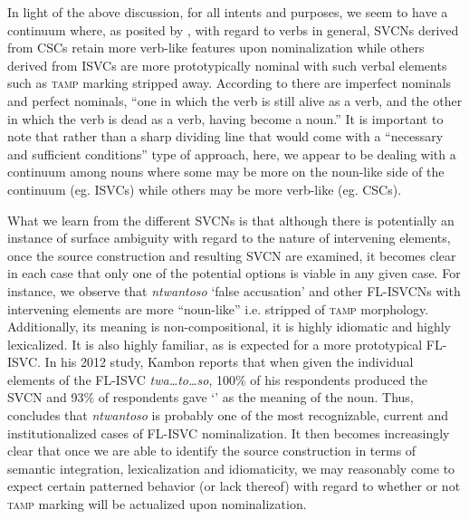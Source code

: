 \documentclass[output=paper
,newtxmath
,modfonts
,nonflat]{langsci/langscibook}
\begin{document}
In light of the above discussion, for all intents and purposes, we seem to have a continuum where, as posited by \citet{vendler1967}, with regard to verbs in general, SVCNs derived from CSCs retain more verb-like features upon nominalization while others derived from ISVCs are more prototypically nominal with such verbal elements such as \textsc{tamp} marking stripped away. According to \citet[131]{vendler1967} there are {imperfect nominals} and {perfect nominals}, “one in which the verb is still alive as a verb, and the other in which the verb is dead as a verb, having become a noun.” It is important to note that rather than a sharp dividing line that would come with a “necessary and sufficient conditions” type of approach, here, we appear to be dealing with a continuum among nouns where some may be more on the noun-like side of the continuum (eg. ISVCs) while others may be more verb-like (eg. CSCs). 

What we learn from the different SVCNs is that although there is potentially an instance of surface ambiguity with regard to the nature of intervening elements, once the source construction and resulting SVCN are examined, it becomes clear in each case that only one of the potential options is viable in any given case. For instance, we observe that \textit{ntwantoso} ‘{false accusation}’ and other FL-ISVCNs with intervening elements are more “noun-like” i.e. stripped of \textsc{tamp} morphology. Additionally, its meaning is non-compositional, it is highly idiomatic and highly lexicalized. It is also highly familiar, as is expected for a more prototypical FL-ISVC. In his 2012 study, Kambon reports that when given the individual elements of the FL-ISVC \textit{twa…to…so}, 100\% of his respondents produced the SVCN and 93\% of respondents gave ‘’ as the meaning of the noun. Thus, \citet{kambon2012} concludes that \textit{ntwantoso} is probably one of the most recognizable, current and institutionalized cases of FL-ISVC nominalization. It then becomes increasingly clear that once we are able to identify the source construction in terms of semantic integration, lexicalization and idiomaticity, we may reasonably come to expect certain patterned behavior (or lack thereof) with regard to whether or not \textsc{tamp} marking will be actualized upon nominalization. 
\end{document}
